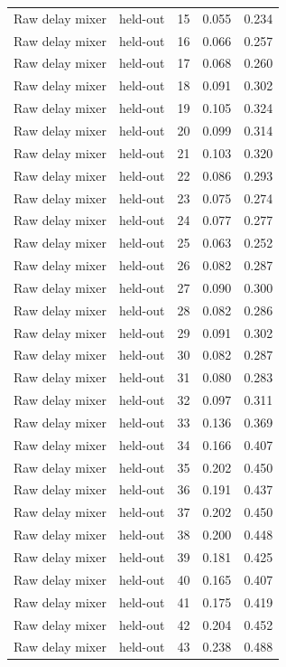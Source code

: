 \begin{tabular}{llrrr}
Raw delay mixer & held-out & 15 & 0.055 & 0.234 \\
Raw delay mixer & held-out & 16 & 0.066 & 0.257 \\
Raw delay mixer & held-out & 17 & 0.068 & 0.260 \\
Raw delay mixer & held-out & 18 & 0.091 & 0.302 \\
Raw delay mixer & held-out & 19 & 0.105 & 0.324 \\
Raw delay mixer & held-out & 20 & 0.099 & 0.314 \\
Raw delay mixer & held-out & 21 & 0.103 & 0.320 \\
Raw delay mixer & held-out & 22 & 0.086 & 0.293 \\
Raw delay mixer & held-out & 23 & 0.075 & 0.274 \\
Raw delay mixer & held-out & 24 & 0.077 & 0.277 \\
Raw delay mixer & held-out & 25 & 0.063 & 0.252 \\
Raw delay mixer & held-out & 26 & 0.082 & 0.287 \\
Raw delay mixer & held-out & 27 & 0.090 & 0.300 \\
Raw delay mixer & held-out & 28 & 0.082 & 0.286 \\
Raw delay mixer & held-out & 29 & 0.091 & 0.302 \\
Raw delay mixer & held-out & 30 & 0.082 & 0.287 \\
Raw delay mixer & held-out & 31 & 0.080 & 0.283 \\
Raw delay mixer & held-out & 32 & 0.097 & 0.311 \\
Raw delay mixer & held-out & 33 & 0.136 & 0.369 \\
Raw delay mixer & held-out & 34 & 0.166 & 0.407 \\
Raw delay mixer & held-out & 35 & 0.202 & 0.450 \\
Raw delay mixer & held-out & 36 & 0.191 & 0.437 \\
Raw delay mixer & held-out & 37 & 0.202 & 0.450 \\
Raw delay mixer & held-out & 38 & 0.200 & 0.448 \\
Raw delay mixer & held-out & 39 & 0.181 & 0.425 \\
Raw delay mixer & held-out & 40 & 0.165 & 0.407 \\
Raw delay mixer & held-out & 41 & 0.175 & 0.419 \\
Raw delay mixer & held-out & 42 & 0.204 & 0.452 \\
Raw delay mixer & held-out & 43 & 0.238 & 0.488 \\

\end{tabular}
